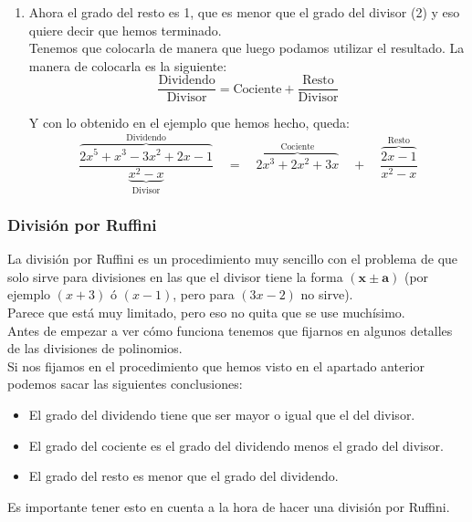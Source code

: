 \documentclass[a4paper,11pt,answers]{exam}
\begin{document}
\begin{enumerate}
\begin{center}
\begin{tabular}{rrrrrrrl}
 $\overline{\phantom{AA}}$&$2x^5$  &  $-2x^4$&  &  &  & & $+2x^3+2x^2 + 3x$\\
       \cline{1-7}
 &&  $2x^4$&$+1x^3$&$-3x^2$&$+2x$&$-1$&\\
 & $\overline{\phantom{AA}}$ &  $2x^4$&$-2x^3$&&&&\\
       \cline{2-7}
 &&&$3x^3$&$-3x^2$&$+2x$&$-1$&\\
 &&$\overline{\phantom{AA}}$&$3x^3$&$-3x^2$&&&\\
       \cline{3-7}
       &&&&&$+2x$&$-1$&
     \end{tabular}
   \end{center}
 \item Ahora el grado del resto es 1, que es menor que el grado del divisor (2) y eso quiere decir que hemos terminado.\\
   Tenemos que colocarla de manera que luego podamos utilizar el resultado. La manera de colocarla es la siguiente:
   \[\frac{\text{Dividendo}}{\text{Divisor}} = \text{Cociente} +
     \frac{\text{Resto}}{\text{Divisor}}\]

   Y con lo obtenido en el ejemplo que hemos hecho, queda:
   \[\frac{\overbrace{2x^5 + x^3 - 3x^2 + 2x - 1}^{\text{Dividendo}}}
     {\underbrace{x^2 - x}_{\text{Divisor}}} \quad=\quad
     \overbrace{2x^3 + 2x^2 + 3x}^{\text{Cociente}} \quad+\quad
     \frac{\overbrace{2x-1}^{\text{Resto}}}{x^2 - x}\]
 \end{enumerate}
 
\subsubsection{División por Ruffini}\label{ruffini}
La división por Ruffini es un procedimiento muy sencillo con el problema de que solo sirve para divisiones en las que el divisor tiene la forma $(\boldsymbol{x\pm a})$ (por ejemplo $(x + 3)$ ó $(x -1)$, pero para $(3x -2)$ no sirve).\\
Parece que está muy limitado, pero eso no quita que se use muchísimo.\\

Antes de empezar a ver cómo funciona tenemos que fijarnos en algunos detalles de las divisiones de polinomios.\\
Si nos fijamos en el procedimiento que hemos visto en el apartado anterior podemos sacar las siguientes conclusiones:
\begin{itemize}\label{props_cociente_resto}
\item El grado del dividendo tiene que ser mayor o igual que el del divisor.
\item El grado del cociente es el grado del dividendo menos el grado del divisor.
\item El grado del resto es menor que el grado del dividendo.
\end{itemize}
Es importante tener esto en cuenta a la hora de hacer una división por Ruffini.\\
\end{document}
